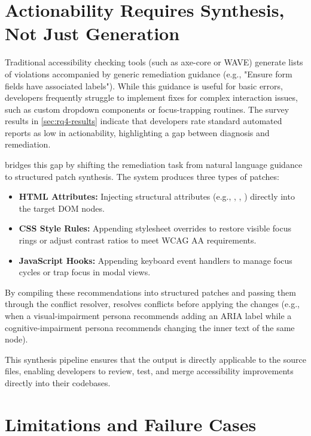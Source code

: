 \section{Actionability Requires Synthesis, Not Just Generation}
\label{sec:discuss-actionability}

Traditional accessibility checking tools (such as axe-core or WAVE) generate lists of violations accompanied by generic remediation guidance (e.g., "Ensure form fields have associated labels"). While this guidance is useful for basic errors, developers frequently struggle to implement fixes for complex interaction issues, such as custom dropdown components or focus-trapping routines. The survey results in \cref{sec:rq4-results} indicate that developers rate standard automated reports as low in actionability, highlighting a gap between diagnosis and remediation.

\versimux{} bridges this gap by shifting the remediation task from natural language guidance to structured patch synthesis. The system produces three types of patches:
\begin{itemize}
  \item \textbf{HTML Attributes:} Injecting structural attributes (e.g., , , ) directly into the target DOM nodes.
  \item \textbf{CSS Style Rules:} Appending stylesheet overrides to restore visible focus rings or adjust contrast ratios to meet WCAG AA requirements.
  \item \textbf{JavaScript Hooks:} Appending keyboard event handlers to manage focus cycles or trap focus in modal views.
\end{itemize}

By compiling these recommendations into structured patches and passing them through the conflict resolver, \versimux{} resolves conflicts before applying the changes (e.g., when a visual-impairment persona recommends adding an ARIA label while a cognitive-impairment persona recommends changing the inner text of the same node). 

This synthesis pipeline ensures that the output is directly applicable to the source files, enabling developers to review, test, and merge accessibility improvements directly into their codebases.


\section{Limitations and Failure Cases}
\label{sec:limitations}

